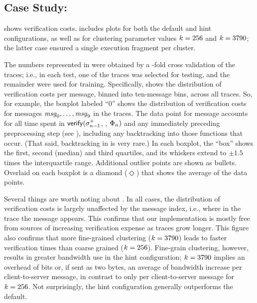 \subsection{Case Study: \tetrinet}
\label{sec:guided:eval:results:tetrinet}

 shows \tetrinet verification costs.
 includes plots for both the default and
hint configurations, as well as for clustering parameter values
$k = 256$ and $k =
3790$; the latter case ensured a single execution
fragment per cluster.

The numbers represented in  were obtained by
a \tetrinetTraces-fold cross validation of the \tetrinet traces; i.e.,
in each test, one of the traces was selected for testing, and the
remainder were used for training.  Specifically,
 shows the distribution of verification
costs per message, binned into ten-message bins, across all \tetrinetTraces
traces.  So, for example, the boxplot labeled ``0'' shows the
distribution of verification costs for messages
$\mathit{msg}_{0},\ldots,\mathit{msg}_{9}$ in the \tetrinetTraces traces.  The data
point for message \msg{\msgNmbr} accounts for all time spent in
$\mathsf{verify}(\sigma^{+}_{n-1}$, \msg{\msgNmbr},
$\Phi_{n})$ and any immediately preceding
preprocessing step (see ), including
any backtracking into those functions that occur.  (That said,
backtracking in \tetrinet is very rare.)  In each boxplot, the ``box''
shows the first, second (median) and third quartiles, and its whiskers
extend to $\pm 1.5$ times the interquartile range.  Additional outlier
points are shown as bullets.  Overlaid on each boxplot is a diamond
($\Diamond$) that shows the average of the data points.

Several things are worth noting about .  In
all cases, the distribution of verification costs is largely
unaffected by the message index, i.e., where in the trace the message
appears.  This confirms that our implementation is mostly free from
sources of increasing verification expense as traces grow longer.
This figure also confirms that more fine-grained clustering
($k = 3790$) leads to faster verification
times than coarse grained ($k = 256$).
Fine-grain clustering, however, results in greater bandwidth use in
the hint configuration; $k = 3790$
implies an overhead of \logTetrinetFineClusterCount bits or, if sent
as two bytes, an average of \tetrinetFineBandwidthPerc bandwidth
increase per client-to-server message, in contrast to only
\tetrinetCoarseBandwidthPerc per client-to-server message for
$k = 256$.  Not surprisingly, the hint
configuration generally outperforms the default.

